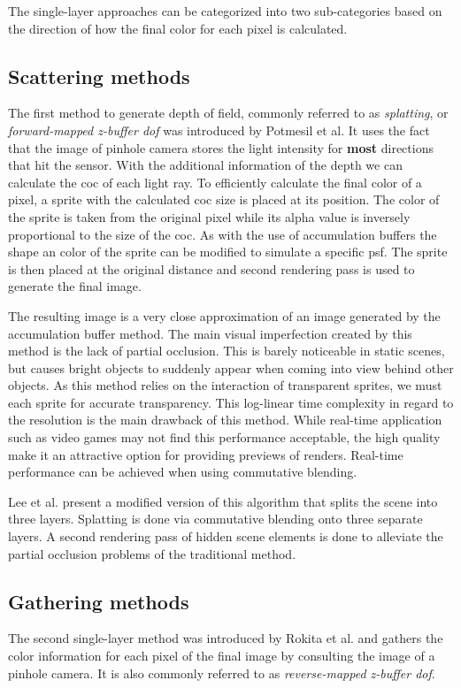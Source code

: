 The single-layer approaches can be categorized into two sub-categories based on the direction of how the final color for each pixel is calculated.

\subsection{Scattering methods}
The first method to generate depth of field, commonly referred to as \textit{splatting}, or \textit{forward-mapped z-buffer \gls{dof}} was introduced by Potmesil et al.\cite{Potmesil.1981}
It uses the fact that the image of pinhole camera stores the light intensity for \textbf{most} directions that hit the sensor.
With the additional information of the depth we can calculate the \gls{coc} of each light ray.
To efficiently calculate the final color of a pixel, a sprite with the calculated \gls{coc} size is placed at its position.
The color of the sprite is taken from the original pixel while its alpha value is inversely proportional to the size of the \gls{coc}.
As with the use of accumulation buffers the shape an color of the sprite can be modified to simulate a specific \gls{psf}.
The sprite is then placed at the original distance and second rendering pass is used to generate the final image.

The resulting image is a very close approximation of an image generated by the accumulation buffer method.
The main visual imperfection created by this method is the lack of partial occlusion.
This is barely noticeable in static scenes, but causes bright objects to suddenly appear when coming into view behind other objects.
As this method relies on the interaction of transparent sprites, we must each sprite for accurate transparency.
This log-linear time complexity in regard to the resolution is the main drawback of this method.
While real-time application such as video games may not find this performance acceptable, the high quality make it an attractive option for providing previews of renders.\cite{Demers.2005}
Real-time performance can be achieved when using commutative blending.

Lee et al. \cite{Lee.2008} present a modified version of this algorithm that splits the scene into three layers.
Splatting is done via commutative blending onto three separate layers.
A second rendering pass of hidden scene elements is done to alleviate the partial occlusion problems of the traditional method.

\subsection{Gathering methods}
The second single-layer method was introduced by Rokita et al. and gathers the color information for each pixel of the final image by consulting the image of a pinhole camera.\cite{Rokita.1993}
It is also commonly referred to as \textit{reverse-mapped z-buffer \gls{dof}}.

